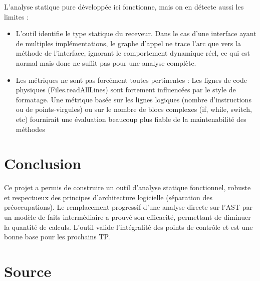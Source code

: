 \documentclass{Templates/customArticle}
\begin{document}
L'analyse statique pure développée ici fonctionne, mais on en détecte aussi les limites :

\begin{itemize}
	\item L'outil identifie le type statique du receveur. Dans le cas d'une interface ayant de multiples implémentations, le graphe d'appel ne trace l'arc que vers la méthode de l'interface, ignorant le comportement dynamique réel, ce qui est normal mais donc ne suffit pas pour une analyse complète.

    \item Les métriques ne sont pas forcément toutes pertinentes : Les lignes de code physiques (Files.readAllLines) sont fortement influencées par le style de formatage. Une métrique basée sur les lignes logiques (nombre d'instructions ou de points-virgules) ou sur le nombre de blocs complexes (if, while, switch, etc) fournirait une évaluation beaucoup plus fiable de la maintenabilité des méthodes
\end{itemize}

\section{Conclusion}

Ce projet a permis de construire un outil d'analyse statique fonctionnel, robuste et respectueux des principes d'architecture logicielle (séparation des préoccupations). Le remplacement progressif d'une analyse directe sur l'AST par un modèle de faits intermédiaire a prouvé son efficacité, permettant de diminuer la quantité de calculs. L'outil valide l'intégralité des points de contrôle et est une bonne base pour les prochains TP.

\section{Source}

\end{document}
